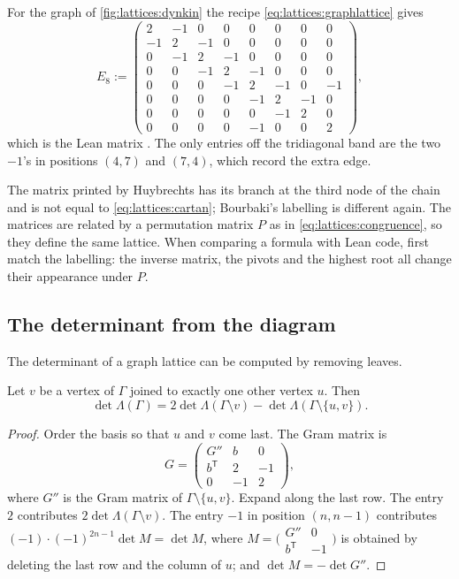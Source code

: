 For the graph of \cref{fig:lattices:dynkin} the recipe \eqref{eq:lattices:graphlattice}
gives
\begin{equation}\label{eq:lattices:cartan}
 E_8:=\begin{pmatrix}
 2&-1&0&0&0&0&0&0\\ -1&2&-1&0&0&0&0&0\\ 0&-1&2&-1&0&0&0&0\\ 0&0&-1&2&-1&0&0&0\\
 0&0&0&-1&2&-1&0&-1\\ 0&0&0&0&-1&2&-1&0\\ 0&0&0&0&0&-1&2&0\\ 0&0&0&0&-1&0&0&2
 \end{pmatrix},
\end{equation}
which is the Lean matrix . The only entries off the tridiagonal band are the
two $-1$'s in positions $(4,7)$ and $(7,4)$, which record the extra edge.

\begin{pitfallbox}
The matrix printed by Huybrechts  has its branch
at the third node of the chain and is not equal to \eqref{eq:lattices:cartan}; Bourbaki's
labelling is different again. The matrices are related by a permutation matrix $P$ as in
\eqref{eq:lattices:congruence}, so they define the same lattice. When comparing a formula
with Lean code, first match the labelling: the inverse matrix, the pivots and the highest
root all change their appearance under $P$.
\end{pitfallbox}

\subsection{The determinant from the diagram}\label{sec:lattices:det}
The determinant of a graph lattice can be computed by removing leaves.

\begin{lemma}\label{lem:lattices:leaf}
Let $v$ be a vertex of $\Gamma$ joined to exactly one other vertex $u$. Then
\[
 \det\Lambda(\Gamma)=2\det\Lambda(\Gamma\setminus v)-\det\Lambda(\Gamma\setminus\{u,v\}) .
\]
\end{lemma}
\begin{proof}
Order the basis so that $u$ and $v$ come last. The Gram matrix is
\[
 G=\begin{pmatrix}G''&b&0\\ b^{\mathsf T}&2&-1\\0&-1&2\end{pmatrix},
\]
where $G''$ is the Gram matrix of $\Gamma\setminus\{u,v\}$. Expand along the last row. The
entry $2$ contributes $2\det\Lambda(\Gamma\setminus v)$. The entry $-1$ in position
$(n,n-1)$ contributes $(-1)\cdot(-1)^{2n-1}\det M=\det M$, where
$M=\bigl(\begin{smallmatrix}G''&0\\b^{\mathsf T}&-1\end{smallmatrix}\bigr)$ is obtained by
deleting the last row and the column of $u$; and $\det M=-\det G''$.
\end{proof}

